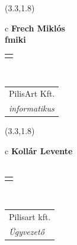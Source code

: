 \documentclass[11pt]{article}
\begin{document}
\makebox(3.3,1.8){
  \renewcommand\arraystretch{1.3}
  \begin{tabular}[c]{c}
    \hspace{8.5mm}
    \LARGE\bf{ Frech Miklós }\\
    \hspace{8.5mm}
    \Large{ fmiki }\\
    \renewcommand\arraystretch{3}
    \begin{tabular}[c]{c}
      \centering
      \fontfamily{phv}\selectfont{
        \textbf{
          \textsc{
            \scriptsize{
            \color{Dark}{ Ismerkedő }\color{Bright}{ Webmester }\color{Bright}{ Sminkmester }\color{Bright}{ Programozó }
            }
          }
        }
      }
    \end{tabular}
    \\
    \renewcommand\arraystretch{1}
    \begin{tabular}{p{3.3in}}
      \hspace{.7cm}PilisArt Kft.\\
      \hspace{.7cm}\emph{ informatikus }\\
    \end{tabular}
  \end{tabular}
}

\makebox(3.3,1.8){
  \renewcommand\arraystretch{1.3}
  \begin{tabular}[c]{c}
    \hspace{8.5mm}
    \LARGE\bf{ Kollár Levente }\\
    \hspace{8.5mm}
    \Large{  }\\
    \renewcommand\arraystretch{3}
    \begin{tabular}[c]{c}
      \centering
      \fontfamily{phv}\selectfont{
        \textbf{
          \textsc{
            \scriptsize{
            \color{Bright}{ Ismerkedő }\color{Bright}{ Webmester }\color{Dark}{ Sminkmester }\color{Bright}{ Programozó }
            }
          }
        }
      }
    \end{tabular}
    \\
    \renewcommand\arraystretch{1}
    \begin{tabular}{p{3.3in}}
      \hspace{.7cm}Pilisart kft.\\
      \hspace{.7cm}\emph{ Ügyvezető }\\
    \end{tabular}
  \end{tabular}
}
\end{document}

